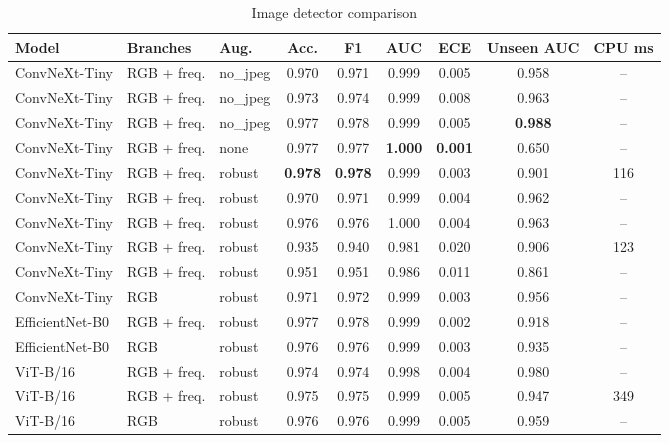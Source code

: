 \begin{table}[t]
\centering
\caption{Image detector comparison}
\label{tab:image-models}
\footnotesize
\begin{tabular}{lllcccccc}
\toprule
Model & Branches & Aug. & Acc. & F1 & AUC & ECE & Unseen AUC & CPU ms \\
\midrule
ConvNeXt-Tiny & RGB + freq. & no_jpeg & 0.970 & 0.971 & 0.999 & 0.005 & 0.958 & -- \\
ConvNeXt-Tiny & RGB + freq. & no_jpeg & 0.973 & 0.974 & 0.999 & 0.008 & 0.963 & -- \\
ConvNeXt-Tiny & RGB + freq. & no_jpeg & 0.977 & 0.978 & 0.999 & 0.005 & \textbf{0.988} & -- \\
ConvNeXt-Tiny & RGB + freq. & none & 0.977 & 0.977 & \textbf{1.000} & \textbf{0.001} & 0.650 & -- \\
ConvNeXt-Tiny & RGB + freq. & robust & \textbf{0.978} & \textbf{0.978} & 0.999 & 0.003 & 0.901 & 116 \\
ConvNeXt-Tiny & RGB + freq. & robust & 0.970 & 0.971 & 0.999 & 0.004 & 0.962 & -- \\
ConvNeXt-Tiny & RGB + freq. & robust & 0.976 & 0.976 & 1.000 & 0.004 & 0.963 & -- \\
ConvNeXt-Tiny & RGB + freq. & robust & 0.935 & 0.940 & 0.981 & 0.020 & 0.906 & 123 \\
ConvNeXt-Tiny & RGB + freq. & robust & 0.951 & 0.951 & 0.986 & 0.011 & 0.861 & -- \\
ConvNeXt-Tiny & RGB & robust & 0.971 & 0.972 & 0.999 & 0.003 & 0.956 & -- \\
EfficientNet-B0 & RGB + freq. & robust & 0.977 & 0.978 & 0.999 & 0.002 & 0.918 & -- \\
EfficientNet-B0 & RGB & robust & 0.976 & 0.976 & 0.999 & 0.003 & 0.935 & -- \\
ViT-B/16 & RGB + freq. & robust & 0.974 & 0.974 & 0.998 & 0.004 & 0.980 & -- \\
ViT-B/16 & RGB + freq. & robust & 0.975 & 0.975 & 0.999 & 0.005 & 0.947 & 349 \\
ViT-B/16 & RGB & robust & 0.976 & 0.976 & 0.999 & 0.005 & 0.959 & -- \\
\bottomrule
\end{tabular}
\end{table}
